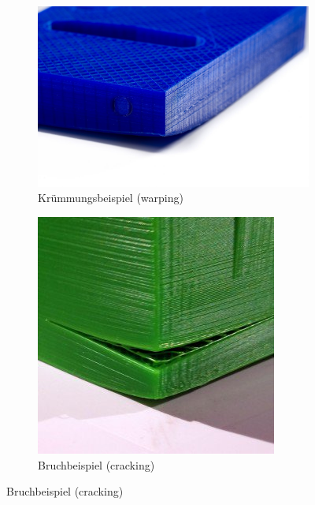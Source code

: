 \documentclass[11pt,a4paper]{article}
\begin{document}
\begin{figure}[H]
    \centering
    \begin{subfigure}[b]{0.4\textwidth}
        \includegraphics[width=\textwidth,cfbox=azul_marcos 4pt 0pt]{FOTOS/EJEMPLO_WARPING}
	\caption*{Krümmungsbeispiel (warping)}
    \end{subfigure}
    \qquad %
    \begin{subfigure}[b]{0.4\textwidth}
        \includegraphics[width=\textwidth,cfbox=azul_marcos 4pt 0pt]{FOTOS/EJEMPLO_CRACKING}
	\caption*{Bruchbeispiel (cracking)}
    \end{subfigure}   
\end{figure}
\end{document}
